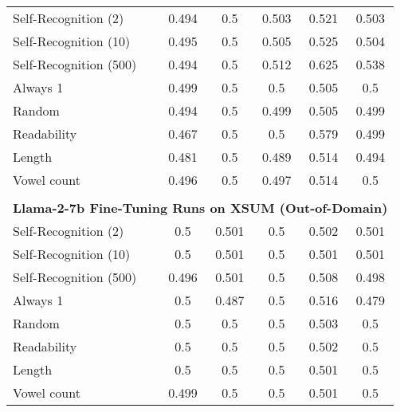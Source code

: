 \begin{table}[h]
\begin{tabular}{l|ccccc}
        Self-Recognition (2)                       & 0.494       & 0.5         & 0.503       & 0.521       & 0.503       \\
        Self-Recognition (10)                      & 0.495       & 0.5         & 0.505       & 0.525       & 0.504       \\
        Self-Recognition (500)                     & 0.494       & 0.5         & 0.512       & 0.625       & 0.538       \\
        Always 1                           & 0.499       & 0.5         & 0.5         & 0.505       & 0.5         \\
        Random                             & 0.494       & 0.5         & 0.499       & 0.505       & 0.499       \\
        Readability                        & 0.467       & 0.5         & 0.5         & 0.579       & 0.499       \\
        Length                             & 0.481       & 0.5         & 0.489       & 0.514       & 0.494       \\
        Vowel count                        & 0.496       & 0.5         & 0.497       & 0.514       & 0.5         \\
        \multicolumn{6}{c}{} \\
        \multicolumn{6}{c}{\textbf{Llama-2-7b Fine-Tuning Runs on XSUM (Out-of-Domain)}} \\
        Self-Recognition (2)                       & 0.5         & 0.501       & 0.5         & 0.502       & 0.501       \\
        Self-Recognition (10)                      & 0.5         & 0.501       & 0.5         & 0.501       & 0.501       \\
        Self-Recognition (500)                     & 0.496       & 0.501       & 0.5         & 0.508       & 0.498       \\
        Always 1                           & 0.5         & 0.487       & 0.5         & 0.516       & 0.479       \\
        Random                             & 0.5         & 0.5         & 0.5         & 0.503       & 0.5         \\
        Readability                        & 0.5         & 0.5         & 0.5         & 0.502       & 0.5         \\
        Length                             & 0.5         & 0.5         & 0.5         & 0.501       & 0.5         \\
        Vowel count                        & 0.499       & 0.5         & 0.5         & 0.501       & 0.5         \\

\end{tabular}
\end{table}

